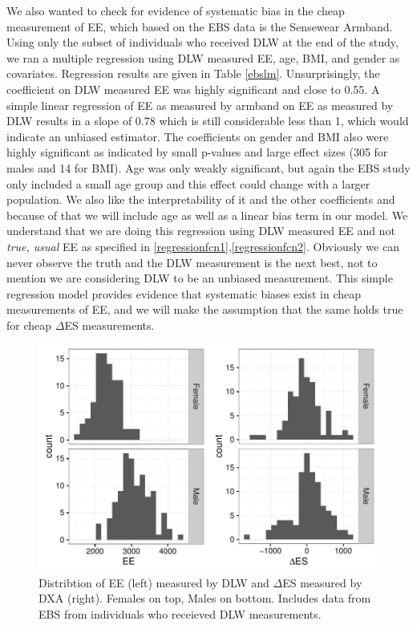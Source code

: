 \documentclass[11pt]{article}\usepackage[]{graphicx}\usepackage[]{color}
\makeatletter
\def\maxwidth{ %
  \ifdim\Gin@nat@width>\linewidth
    \linewidth
  \else
    \Gin@nat@width
  \fi
}
\newenvironment{knitrout}{}{} %
\makeatother
\begin{document}
We also wanted to check for evidence of systematic bias in the cheap measurement of EE, which based on the EBS data is the Sensewear Armband. Using only the subset of individuals who received DLW at the end of the study, we ran a multiple regression using DLW measured EE, age, BMI, and gender as covariates. Regression results are given in Table \eqref{ebslm}. Unsurprisingly, the coefficient on DLW measured EE was highly significant and close to 0.55. A simple linear regression of EE as measured by armband on EE as measured by DLW results in a slope of 0.78 which is still considerable less than 1, which would indicate an unbiased estimator. The coefficients on gender and BMI also were highly significant as indicated by small p-values and large effect sizes (305 for males and 14 for BMI). Age was only weakly significant, but again the EBS study only included a small age group and this effect could change with a larger population. We also like the interpretability of it and the other coefficients and because of that we will include age as well as a linear bias term in our model. We understand that we are doing this regression using DLW measured EE and not \emph{true, usual} EE as specified in \eqref{regressionfcn1},\eqref{regressionfcn2}. Obviously we can never observe the truth and the DLW measurement is the next best, not to mention we are considering DLW to be an unbiased measurement. This simple regression model provides evidence that systematic biases exist in cheap measurements of EE, and we will make the assumption that the same holds true for cheap $\Delta$ES measurements.

\begin{knitrout}
\color{fgcolor}\begin{figure}

{\centering \includegraphics[width=\maxwidth]{figure/ebsw-1} 

}

\caption[Distribtion of EE (left) measured by DLW and ]{Distribtion of EE (left) measured by DLW and $\Delta$ES measured by DXA (right). Females on top, Males on bottom. Includes data from EBS from individuals who receieved DLW measurements.}\label{fig:ebsw}
\end{figure}


\end{knitrout}
\end{document}
